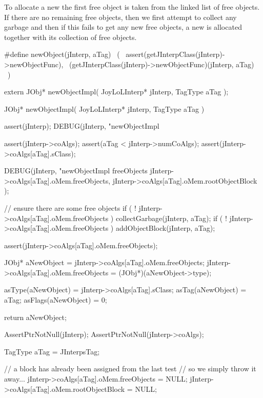 \startTestSuite[newObject]

To allocate a new  the first free object is taken from 
the linked list of free objects. If there are no remaining free objects, 
then we first attempt to collect any garbage and then if this fails to get 
any new free objects, a new  is allocated together with 
its collection of free objects. 

\startCHeader
#define newObject(jInterp, aTag)                              \
  (                                                           \
    assert(getJInterpClass(jInterp)->newObjectFunc),          \
    (getJInterpClass(jInterp)->newObjectFunc)(jInterp, aTag)  \
  )
\stopCHeader

\setCHeaderStream{private}
\startCHeader
extern JObj* newObjectImpl(
  JoyLoLInterp* jInterp,
  TagType aTag
);
\stopCHeader
{}

\startCCode
JObj* newObjectImpl(
  JoyLoLInterp* jInterp,
  TagType aTag
) {
  assert(jInterp);
  DEBUG(jInterp, "newObjectImpl %
  
  assert(jInterp->coAlgs);
  assert(aTag < jInterp->numCoAlgs);
  assert(jInterp->coAlgs[aTag].sClass);

  DEBUG(jInterp, "newObjectImpl freeObjects %
    jInterp->coAlgs[aTag].oMem.freeObjects,
    jInterp->coAlgs[aTag].oMem.rootObjectBlock
  ); 

  // ensure there are some free objects
  if ( ! jInterp->coAlgs[aTag].oMem.freeObjects ) 
    collectGarbage(jInterp, aTag);
  if ( ! jInterp->coAlgs[aTag].oMem.freeObjects )
    addObjectBlock(jInterp, aTag);

  assert(jInterp->coAlgs[aTag].oMem.freeObjects);

  JObj* aNewObject   = jInterp->coAlgs[aTag].oMem.freeObjects;
  jInterp->coAlgs[aTag].oMem.freeObjects = (JObj*)(aNewObject->type);

  asType(aNewObject)  = jInterp->coAlgs[aTag].sClass;
  asTag(aNewObject)   = aTag;
  asFlags(aNewObject) = 0;

  return aNewObject;
}
\stopCCode

\startCTest
  AssertPtrNotNull(jInterp);
  AssertPtrNotNull(jInterp->coAlgs);

  TagType aTag = JInterpsTag;
  
  // a block has already been assigned from the last test
  // so we simply throw it away...
  jInterp->coAlgs[aTag].oMem.freeObjects = NULL;
  jInterp->coAlgs[aTag].oMem.rootObjectBlock = NULL;

